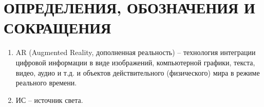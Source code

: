 \chapter*{ОПРЕДЕЛЕНИЯ, ОБОЗНАЧЕНИЯ И СОКРАЩЕНИЯ}

\begin{enumerate}
	\item AR (Augmented Reality, дополненная реальность) -- технология интеграции цифровой информации в виде изображений, компьютерной графики, текста, видео, аудио и т.д. и объектов действительного (физического) мира в режиме реального времени.
	\item ИС -- источник света.
\end{enumerate}